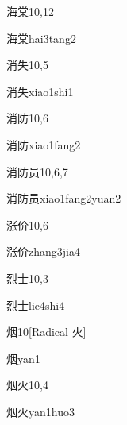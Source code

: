 \begin{entry}{海棠}{10,12}
  \begin{phonetics}{海棠}{hai3tang2}
  \end{phonetics}
\end{entry}

\begin{entry}{消失}{10,5}
  \begin{phonetics}{消失}{xiao1shi1}
  \end{phonetics}
\end{entry}

\begin{entry}{消防}{10,6}
  \begin{phonetics}{消防}{xiao1fang2}
  \end{phonetics}
\end{entry}

\begin{entry}{消防员}{10,6,7}
  \begin{phonetics}{消防员}{xiao1fang2yuan2}
  \end{phonetics}
\end{entry}

\begin{entry}{涨价}{10,6}
  \begin{phonetics}{涨价}{zhang3jia4}
  \end{phonetics}
\end{entry}

\begin{entry}{烈士}{10,3}
  \begin{phonetics}{烈士}{lie4shi4}
  \end{phonetics}
\end{entry}

\begin{entry}{烟}{10}[Radical 火]
  \begin{phonetics}{烟}{yan1}
  \end{phonetics}
\end{entry}

\begin{entry}{烟火}{10,4}
  \begin{phonetics}{烟火}{yan1huo3}
  \end{phonetics}
\end{entry}

